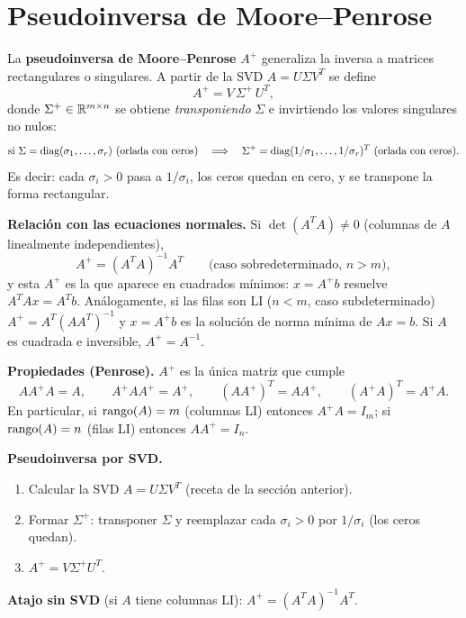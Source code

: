 \section{Pseudoinversa de Moore--Penrose}

\begin{teoria}
La \textbf{pseudoinversa de Moore--Penrose} $A^{+}$ generaliza la inversa a matrices rectangulares o singulares. A partir de la SVD $A=U\Sigma V^T$ se define
\[
A^{+}=V\,\Sigma^{+}\,U^T,
\]
donde $\Sigma^{+}\in\mathbb{R}^{m\times n}$ se obtiene \emph{transponiendo} $\Sigma$ e invirtiendo los valores singulares no nulos:
\[
\text{si }\Sigma=\diag(\sigma_1,\dots,\sigma_r)\ \text{(orlada con ceros)}
\quad\Longrightarrow\quad
\Sigma^{+}=\diag(1/\sigma_1,\dots,1/\sigma_r)^{T}\ \text{(orlada con ceros)}.
\]
Es decir: cada $\sigma_i>0$ pasa a $1/\sigma_i$, los ceros quedan en cero, y se transpone la forma rectangular.

\medskip
\textbf{Relación con las ecuaciones normales.} Si $\det(A^TA)\ne0$ (columnas de $A$ linealmente independientes),
\[
A^{+}=(A^TA)^{-1}A^T
\qquad\text{(caso sobredeterminado, $n>m$)},
\]
y esta $A^+$ es la que aparece en cuadrados mínimos: $x=A^{+}b$ resuelve $A^TAx=A^Tb$. Análogamente, si las filas son LI ($n<m$, caso subdeterminado) $A^{+}=A^T(AA^T)^{-1}$ y $x=A^+b$ es la solución de norma mínima de $Ax=b$. Si $A$ es cuadrada e inversible, $A^{+}=A^{-1}$.

\textbf{Propiedades (Penrose).} $A^+$ es la única matriz que cumple
\[
AA^{+}A=A,\qquad A^{+}AA^{+}=A^{+},\qquad (AA^{+})^T=AA^{+},\qquad (A^{+}A)^T=A^{+}A .
\]
En particular, si $\operatorname{rango}(A)=m$ (columnas LI) entonces $A^{+}A=I_m$; si $\operatorname{rango}(A)=n$ (filas LI) entonces $AA^{+}=I_n$.
\end{teoria}

\begin{receta}
\textbf{Pseudoinversa por SVD.}
\begin{enumerate}
\item Calcular la SVD $A=U\Sigma V^T$ (receta de la sección anterior).
\item Formar $\Sigma^{+}$: transponer $\Sigma$ y reemplazar cada $\sigma_i>0$ por $1/\sigma_i$ (los ceros quedan).
\item $A^{+}=V\Sigma^{+}U^T$.
\end{enumerate}
\textbf{Atajo sin SVD} (si $A$ tiene columnas LI): $A^{+}=(A^TA)^{-1}A^T$.
\end{receta}

